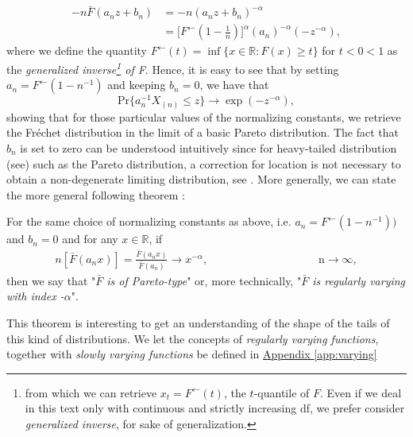\begin{equation*}
\begin{aligned}
-n\bar{F}(a_nz+b_n)
& =-n(a_nz+b_n)^{-\alpha} \\
& =\Big[F^{\leftarrow}(1-\frac{1}{n})\Big]^{\alpha}(a_n)^{-\alpha}(-z^{-\alpha}),
\end{aligned}
\end{equation*}
where we define the quantity $F^{\leftarrow}(t)=\inf\{x\in\mathbb{R}:F(x)\geq t\}$ for $t<0<1$ as the \emph{generalized inverse\footnote{from which we can retrieve $x_t=F^{\leftarrow}(t)$, the $t$-quantile of $F$. Even if we deal in this text only with continuous and strictly increasing df, we prefer consider \emph{generalized inverse}, for sake of generalization.} of F}.
Hence, it is easy to see that by setting $a_n=F^{\leftarrow}(1-n^{-1})$ and keeping $b_n=0$, we have that 
\begin{equation*}
\text{Pr}\{a_n^{-1}X_{(n)}\leq z\}\rightarrow \exp (-z^{-\alpha}),
\end{equation*}
showing that for those particular values of the normalizing constants, we retrieve the Fréchet distribution in the limit of a basic Pareto distribution. The fact that $b_n$ is set to zero can be understood intuitively since for heavy-tailed distribution (see) such as the Pareto distribution, a correction for location is not necessary to obtain a non-degenerate limiting distribution, see \citet[pp.51]{beirlant_practical_1996}.
More generally, we can state the more general following theorem :
\begin{theorem} For the same choice of normalizing constants as above, i.e. $a_n=F^{\leftarrow}(1-n^{-1}))$ and $b_n=0$ and for any $x\in\mathbb{R}$, if
	\begin{equation}
	\begin{aligned}
	n[\bar{F}(a_nx)]= \frac{\bar{F}(a_nx)}{\bar{F}(a_n)}\rightarrow x^{-\alpha} ,&&&&&&&&&&&& \text{ n}\to\infty,
	\end{aligned}
	\end{equation}
	then we say that "\emph{$\bar{F}$ is of Pareto-type}" or, more technically, "\emph{$\bar{F}$ is regularly varying with index -$\alpha$}".
\end{theorem}

This theorem is interesting to get an understanding of the shape of the tails of this kind of distributions. 
We let the concepts of \emph{regularly varying functions}, together with \emph{slowly varying functions} be defined in \hyperref[app:varying]{Appendix \ref{app:varying}}

